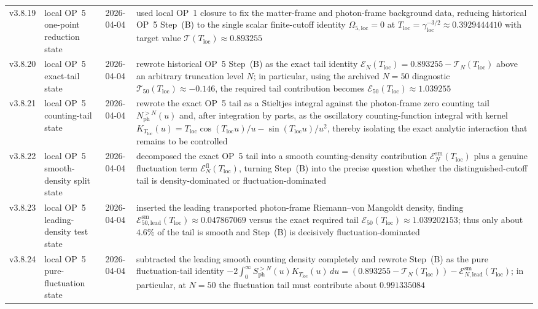 {\begin{longtable}{|p{}|p{}|p{}|p{}|}
v3.8.19 & local OP~5 one-point reduction state & 2026-04-04 & used local OP~1 closure to fix the matter-frame and photon-frame background data, reducing historical OP~5 Step~(B) to the single scalar finite-cutoff identity \(\Omega_{5,\mathrm{loc}}=0\) at \(T_{\mathrm{loc}}=\gamma_{\mathrm{loc}}^{-3/2}\approx0.3929444410\) with target value \(\mathcal T(T_{\mathrm{loc}})\approx0.893255\) \\
v3.8.20 & local OP~5 exact-tail state & 2026-04-04 & rewrote historical OP~5 Step~(B) as the exact tail identity \(\mathcal E_N(T_{\mathrm{loc}})=0.893255-\mathcal T_N(T_{\mathrm{loc}})\) above an arbitrary truncation level \(N\); in particular, using the archived \(N=50\) diagnostic \(\mathcal T_{50}(T_{\mathrm{loc}})\approx-0.146\), the required tail contribution becomes \(\mathcal E_{50}(T_{\mathrm{loc}})\approx1.039255\) \\
v3.8.21 & local OP~5 counting-tail state & 2026-04-04 & rewrote the exact OP~5 tail as a Stieltjes integral against the photon-frame zero counting tail \(N_{\mathrm{ph}}^{>N}(u)\) and, after integration by parts, as the oscillatory counting-function integral with kernel \(K_{T_{\mathrm{loc}}}(u)=T_{\mathrm{loc}}\cos(T_{\mathrm{loc}}u)/u-\sin(T_{\mathrm{loc}}u)/u^2\), thereby isolating the exact analytic interaction that remains to be controlled \\
v3.8.22 & local OP~5 smooth-density split state & 2026-04-04 & decomposed the exact OP~5 tail into a smooth counting-density contribution \(\mathcal E_N^{\mathrm{sm}}(T_{\mathrm{loc}})\) plus a genuine fluctuation term \(\mathcal E_N^{\mathrm{fl}}(T_{\mathrm{loc}})\), turning Step~(B) into the precise question whether the distinguished-cutoff tail is density-dominated or fluctuation-dominated \\
v3.8.23 & local OP~5 leading-density test state & 2026-04-04 & inserted the leading transported photon-frame Riemann--von Mangoldt density, finding \(\mathcal E_{50,\mathrm{lead}}^{\mathrm{sm}}(T_{\mathrm{loc}})\approx 0.047867069\) versus the exact required tail \(\mathcal E_{50}(T_{\mathrm{loc}})\approx 1.039202153\); thus only about \(4.6\%\) of the tail is smooth and Step~(B) is decisively fluctuation-dominated \\
v3.8.24 & local OP~5 pure-fluctuation state & 2026-04-04 & subtracted the leading smooth counting density completely and rewrote Step~(B) as the pure fluctuation-tail identity \(-2\int_0^\infty S_{\mathrm{ph}}^{>N}(u)K_{T_{\mathrm{loc}}}(u)\,du=(0.893255-\mathcal T_N(T_{\mathrm{loc}}))-\mathcal E_{N,\mathrm{lead}}^{\mathrm{sm}}(T_{\mathrm{loc}})\); in particular, at \(N=50\) the fluctuation tail must contribute about \(0.991335084\) \\

\end{longtable}}
